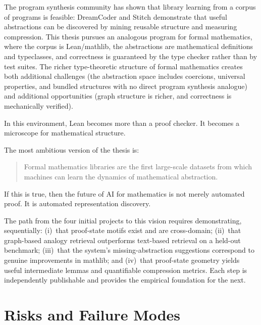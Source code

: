 \documentclass[12pt, a4paper]{article}
\begin{document}
The program synthesis community has shown that library learning from a corpus
of programs is feasible: DreamCoder \citep{ellis2021dreamcoder} and Stitch
\citep{bowers2023stitch} demonstrate that useful abstractions can be
discovered by mining reusable structure and measuring compression. This thesis
pursues an analogous program for formal mathematics, where the corpus is
Lean/mathlib, the abstractions are mathematical definitions and typeclasses,
and correctness is guaranteed by the type checker rather than by test suites.
The richer type-theoretic structure of formal mathematics creates both
additional challenges (the abstraction space includes coercions, universal
properties, and bundled structures with no direct program synthesis analogue)
and additional opportunities (graph structure is richer, and correctness is
mechanically verified).

In this environment, Lean becomes more than a proof checker. It becomes a
microscope for mathematical structure.

The most ambitious version of the thesis is:

\begin{quote}
Formal mathematics libraries are the first large-scale datasets from which
machines can learn the dynamics of mathematical abstraction.
\end{quote}

If this is true, then the future of AI for mathematics is not merely
automated proof. It is automated representation discovery.

The path from the four initial projects to this vision requires
demonstrating, sequentially: (i)~that proof-state motifs exist and are
cross-domain; (ii)~that graph-based analogy retrieval outperforms text-based
retrieval on a held-out benchmark; (iii)~that the system's
missing-abstraction suggestions correspond to genuine improvements in
mathlib; and (iv)~that proof-state geometry yields useful intermediate lemmas
and quantifiable compression metrics. Each step is independently publishable
and provides the empirical foundation for the next.

\section{Risks and Failure Modes}
\end{document}
